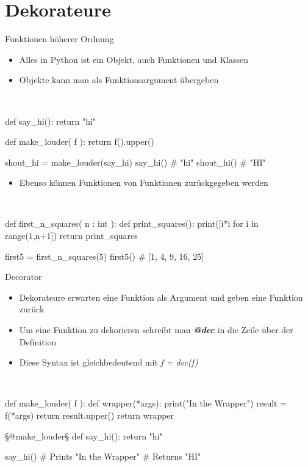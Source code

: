 \documentclass[ngerman]{beamer}
\theoremstyle{definition}
\begin{document}
\section{Dekorateure}
\begin{frame}{Funktionen höherer Ordnung}
\begin{itemize}
	\item Alles in Python ist ein Objekt, auch Funktionen und Klassen
	\item Objekte kann man als Funktionsargument übergeben
	 
\end{itemize}
\begin{exampleblock}~
	\begin{python}[numbers=none]
def say_hi():
	return "hi"
	
def make_louder( f ):
	return f().upper()
	
shout_hi = make_louder(say_hi)
say_hi()	# "hi"
shout_hi()	# "HI"
	\end{python}
\end{exampleblock}

\framebreak

\begin{itemize}
	\item Ebenso können Funktionen von Funktionen zurückgegeben werden
\end{itemize}
\begin{exampleblock}~
	\begin{python}[numbers=none]
def first_n_squares( n : int ):
	def print_squares():
		print([i*i for i in range(1,n+1])
	return print_squares
	
first5 = first_n_squares(5)
first5() # [1, 4, 9, 16, 25]
	\end{python}
\end{exampleblock}
\end{frame}
\begin{frame}{Decorator}
\begin{itemize}
	\item Dekorateure erwarten eine Funktion als Argument und geben eine Funktion zurück
	\item Um eine Funktion zu dekorieren schreibt man \emph{\bfseries @dec} in die Zeile über der Definition
	\item Diese Syntax ist gleichbedeutend mit \emph{f = dec(f)}
\end{itemize}
\framebreak
\begin{exampleblock}~
	\begin{python}[numbers=none]
def make_louder( f ):
	def wrapper(*args):
		print("In the Wrapper")
		result = f(*args)
		return result.upper()
	return wrapper

§@make_louder§
def say_hi():
	return "hi"

say_hi() 	# Prints "In the Wrapper"
			# Returns "HI"
	\end{python}
\end{exampleblock}
\end{frame}
\end{document}
